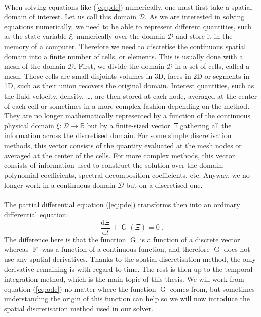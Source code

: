     \paragraph{}
    When solving equations like (\ref{eq:pde}) numerically, one must first take a spatial domain of interest.
    Let us call this domain $\mathcal{D}$.
    As we are interested in solving equations numerically, we need to be able to represent different quantities, such as the state variable $\xi$, numerically over the domain $\mathcal{D}$ and store it in the memory of a computer.
    Therefore we need to discretise the continuous spatial domain into a finite number of cells, or elements.
    This is usually done with a mesh of the domain $\mathcal{D}$.
    First, we divide the domain $\mathcal{D}$ in a set of cells, called a mesh.
    Those cells are small disjoints volumes in 3D, faces in 2D or segments in 1D, such as their union recovers the original domain.
    Interest quantities, such as the fluid velocity, density, \dots, are then stored at each node, averaged at the center of each cell or sometimes in a more complex fashion depending on the method.
    They are no longer mathematically represented by a function of the continuous physical domain $\xi: \mathcal{D} \rightarrow \mathbb{R}$ but by a finite-sized vector $\Xi$ gathering all the information across the discretised domain.
    For some simple discretisation methods, this vector consists of the quantity evaluated at the mesh nodes or averaged at the center of the cells.
    For more complex methods, this vector consists of information used to construct the solution over the domain: polynomial coefficients, spectral decomposition coefficients, etc.
    Anyway, we no longer work in a continuous domain $\mathcal{D}$ but on a discretised one.

    \paragraph{}
    The partial differential equation (\ref{eq:pde}) transforms then into an ordinary differential equation:
    \begin{equation}\label{eq:ode}
      \frac{\mathrm{d} \Xi}{\mathrm{d} t} + \operatorname{G}\left(\Xi\right) = 0 \ .
    \end{equation}
    The difference here is that the function $\operatorname{G}$ is a function of a discrete vector whereas $\operatorname{F}$ was a function of a continuous function, and therefore $\operatorname{G}$ does not use any spatial derivatives.
    Thanks to the spatial discretisation method, the only derivative remaining is with regard to time.
    The rest is then up to the temporal integration method, which is the main topic of this thesis.
    We will work from equation (\ref{eq:ode}) no matter where the function $\operatorname{G}$ comes from, but sometimes understanding the origin of this function can help so we will now introduce the spatial discretisation method used in our solver.


